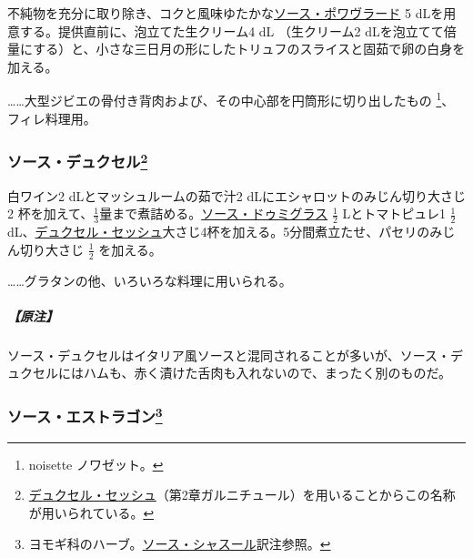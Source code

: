 \begin{recette}

 
 

不純物を充分に取り除き、コクと風味ゆたかな\protect\hyperlink{sauce-poivrade}{ソース・ポワヴラード}
5 dLを用意する。提供直前に、泡立てた生クリーム4 dL （生クリーム2
dLを泡立てて倍量にする）と、小さな三日月の形にしたトリュフのスライスと固茹で卵の白身を加える。

\ldots{}\ldots{}大型ジビエの骨付き背肉および、その中心部を円筒形に切り出したもの
\footnote{noisette ノワゼット。}、フィレ料理用。

\atoaki{}

\hypertarget{sauce-duxelles}{%
\subsubsection[ソース・デュクセル]{\texorpdfstring{ソース・デュクセル\footnote{\protect\hyperlink{duxelles-seche}{デュクセル・セッシュ}（第2章ガルニチュール）を用いることからこの名称が用いられている。}}{ソース・デュクセル}}\label{sauce-duxelles}}


 

白ワイン2 dLとマッシュルームの茹で汁2
dLにエシャロットのみじん切り大さじ2
杯を加えて、\(\frac{1}{3}\)量まで煮詰める。\protect\hyperlink{sauce-demi-glace}{ソース・ドゥミグラス}
\(\frac{1}{2}\) Lとトマトピュレ1 \(\frac{1}{2}\)
dL、\protect\hyperlink{duxelles-seche}{デュクセル・セッシュ}大さじ4杯を加える。5分間煮立たせ、パセリのみじん切り大さじ
\(\frac{1}{2}\) を加える。

\ldots{}\ldots{}グラタンの他、いろいろな料理に用いられる。

\hypertarget{nota-sauce-duxelles}{%
\subparagraph{【原注】}\label{nota-sauce-duxelles}}

ソース・デュクセルはイタリア風ソースと混同されることが多いが、ソース・デュクセルにはハムも、赤く漬けた舌肉も入れないので、まったく別のものだ。

\atoaki{}

\hypertarget{sauce-estragon}{%
\subsubsection[ソース・エストラゴン]{\texorpdfstring{ソース・エストラゴン\footnote{ヨモギ科のハーブ。\protect\hyperlink{sauce-chasseur}{ソース・シャスール}訳注参照。}}{ソース・エストラゴン}}\label{sauce-estragon}}


\end{recette}
